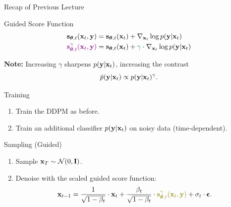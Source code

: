 \documentclass{beamer}
\begin{document}
\begin{frame}{Recap of Previous Lecture}
	\begin{block}{Guided Score Function}
		\vspace{-0.5cm}
		\begin{align*}
			\mathbf{s}_{\boldsymbol{\theta}, t}(\mathbf{x}_t, \mathbf{y}) &= \mathbf{s}_{\boldsymbol{\theta}, t}(\mathbf{x}_t) + \nabla_{\mathbf{x}_t} \log p(\mathbf{y} | \mathbf{x}_t) \\
			{\color{violet}\mathbf{s}^{\gamma}_{\boldsymbol{\theta}, t}(\mathbf{x}_t, \mathbf{y})} &= \mathbf{s}_{\boldsymbol{\theta}, t}(\mathbf{x}_t) + {\color{teal}\gamma} \cdot \nabla_{\mathbf{x}_t} \log p(\mathbf{y} | \mathbf{x}_t)
		\end{align*}
		\vspace{-0.5cm}
	\end{block}
	\textbf{Note:} Increasing $\gamma$ sharpens $p(\mathbf{y} | \mathbf{x}_t)$, increasing the contrast
	\[
		\hat{p}(\mathbf{y} | \mathbf{x}_t) \propto p(\mathbf{y} | \mathbf{x}_t)^{\gamma}.
	\]
	\vspace{-1.0cm}
	\begin{block}{Training}
		\begin{enumerate}
			\item Train the DDPM as before.
			\item Train an additional classifier $p(\mathbf{y} | \mathbf{x}_t)$ on noisy data (time-dependent).
		\end{enumerate}
		\vspace{-0.5cm}
	\end{block}
	\vspace{-0.2cm}
	\begin{block}{Sampling (Guided)}
		\begin{enumerate}
			\item Sample $\mathbf{x}_T \sim \mathcal{N}(0, \mathbf{I})$.
			\item Denoise with the scaled guided score function:
			\vspace{-0.3cm}
			\[
				\bx_{t-1} = \frac{1}{\sqrt{1 - \beta_t}} \cdot \bx_t + \frac{\beta_t}{\sqrt{1 - \beta_t}} \cdot  {\color{olive}\bs^{\gamma}_{\btheta, t}(\bx_t, \by)} + \sigma_t \cdot \bepsilon.
			\]
			\vspace{-0.5cm}
		\end{enumerate}
	\end{block}
\end{frame}
\end{document}
